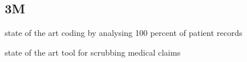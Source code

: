 
\subsection{3M}


state of the art coding by analysing 100 percent of patient records

state of the art tool for scrubbing medical claims
